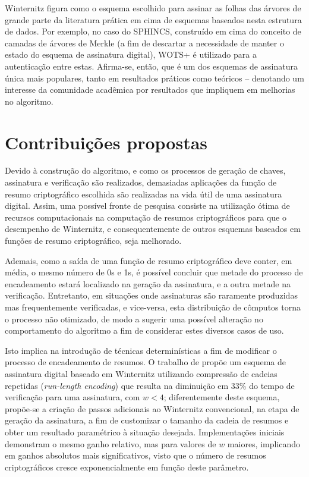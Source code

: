 \documentclass[12pt]{article}
\begin{document}
Winternitz figura como o esquema escolhido para assinar as folhas das árvores
de grande parte da literatura prática em cima de esquemas baseados nesta
estrutura de dados. Por exemplo, no caso do SPHINCS, construído em cima do
conceito de camadas de árvores de Merkle (a fim de descartar a necessidade de
manter o estado do esquema de assinatura digital), WOTS+ é utilizado para a
autenticação entre estas. Afirma-se, então, que é um dos esquemas de assinatura
única mais populares, tanto em resultados práticos como teóricos -- denotando
um interesse da comunidade acadêmica por resultados que impliquem em melhorias
no algoritmo.

\section{Contribuições propostas}

Devido à construção do algoritmo, e como os processos de geração de chaves,
assinatura e verificação são realizados, demasiadas aplicações da função de
resumo criptográfico escolhida são realizadas na vida útil de uma assinatura
digital. Assim, uma possível fronte de pesquisa consiste na utilização ótima de
recursos computacionais na computação de resumos criptográficos para que o
desempenho de Winternitz, e consequentemente de outros esquemas baseados em
funções de resumo criptográfico, seja melhorado.

Ademais, como a saída de uma função de resumo criptográfico deve conter, em
média, o mesmo número de 0s e 1s, é possível concluir que metade do processo de
encadeamento estará localizado na geração da assinatura, e a outra metade na
verificação. Entretanto, em situações onde assinaturas são raramente produzidas
mas frequentemente verificadas, e vice-versa, esta distribuição de cômputos
torna o processo não otimizado, de modo a sugerir uma possível alteração no
comportamento do algoritmo a fim de considerar estes diversos casos de uso.

Isto implica na introdução de técnicas determinísticas a fim de modificar o
processo de encadeamento de resumos. O trabalho de
\cite{Steinwandt:2008:OSU:1412758.1412979} propõe um esquema de assinatura
digital baseado em Winternitz utilizando compressão de cadeias repetidas
(\emph{run-length encoding}) que resulta na diminuição em $33\%$ do tempo de
verificação para uma assinatura, com $w < 4$; diferentemente deste esquema,
propõe-se a criação de passos adicionais ao Winternitz convencional, na etapa
de geração da assinatura, a fim de customizar o tamanho da cadeia de resumos e
obter um resultado paramétrico à situação desejada.  Implementações iniciais
demonstram o mesmo ganho relativo, mas para valores de $w$ maiores, implicando
em ganhos absolutos mais significativos, visto que o número de resumos
criptográficos cresce exponencialmente em função deste parâmetro.
\end{document}
